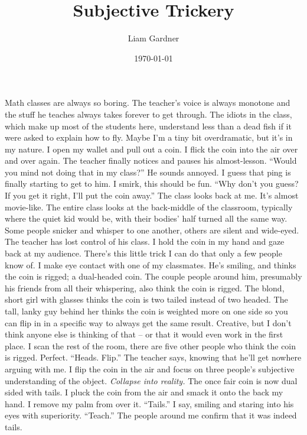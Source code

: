 \documentclass[a4paper, 12pt]{book}
\title{Subjective Trickery}
\author{Liam Gardner}
\date{\today}
\begin{document}
\newcommand\tab[1][1cm]{\hspace*{#1}}
\maketitle
\tab
Math classes are always so boring. The teacher’s voice is always monotone and the stuff he teaches always takes forever to get through. The idiots in the class, which make up most of the students here, understand less than a dead fish if it were asked to explain how to fly. Maybe I’m a tiny bit overdramatic, but it’s in my nature.
\newline
\tab
I open my wallet and pull out a coin. I flick the coin into the air over and over again. The teacher finally notices and pauses his almost-lesson. ``Would you mind not doing that in my class?'' He sounds annoyed. I guess that ping is finally starting to get to him. I smirk, this should be fun.
\newline
\tab
``Why don’t you guess? If you get it right, I’ll put the coin away.'' The class looks back at me. It’s almost movie-like. The entire class looks at the back-middle of the classroom, typically where the quiet kid would be, with their bodies’ half turned all the same way. Some people snicker and whisper to one another, others are silent and wide-eyed. The teacher has lost control of his class. I hold the coin in my hand and gaze back at my audience. There’s this little trick I can do that only a few people know of. I make eye contact with one of my classmates. He’s smiling, and thinks the coin is rigged; a dual-headed coin. The couple people around him, presumably his friends from all their whispering, also think the coin is rigged. The blond, short girl with glasses thinks the coin is two tailed instead of two headed. The tall, lanky guy behind her thinks the coin is weighted more on one side so you can flip in in a specific way to always get the same result. Creative, but I don’t think anyone else is thinking of that -- or that it would even work in the first place. I scan the rest of the room, there are five other people who think the coin is rigged. Perfect.
\newline
\tab
``Heads. Flip.'' The teacher says, knowing that he’ll get nowhere arguing with me. I flip the coin in the air and focus on three people’s subjective understanding of the object.
\newline
\tab
\textit{Collapse into reality.}
\newline
\tab
The once fair coin is now dual sided with tails. I pluck the coin from the air and smack it onto the back my hand. I remove my palm from over it. ``Tails.'' I say, smiling and staring into his eyes with superiority. ``Teach.'' The people around me confirm that it was indeed tails.
\end{document}
